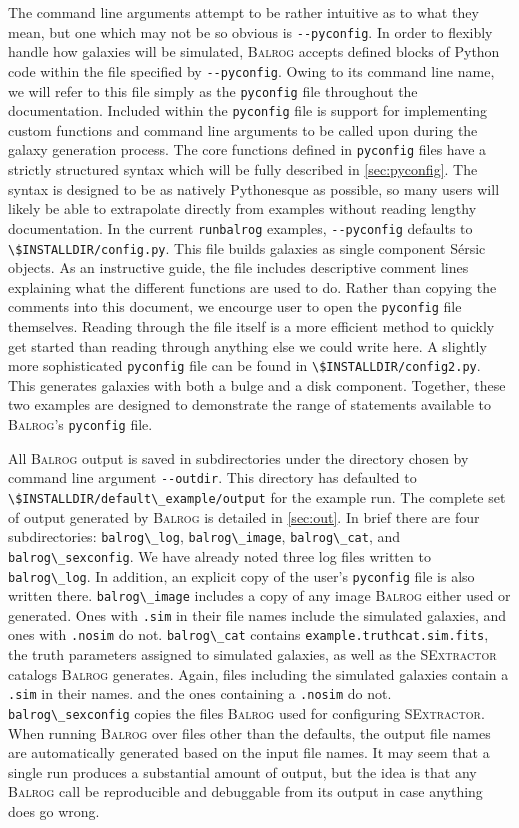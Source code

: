 \documentclass[12pt]{book}
\newcommand{\codett}[1]{\lstinline{#1}}
\newcommand{\py}{Python}
\newcommand{\pyconfig}{\codett{pyconfig}}
\newcommand{\balrog}{\textsc{Balrog}}
\newcommand{\sex}{\textsc{SExtractor}}
\newcommand{\opt}[1]{\codett{--#1}}
\newcommand{\sersic}{S\'{e}rsic}
\begin{document}
The command line arguments attempt to be rather intuitive as to what they mean,
but one which may not be so obvious is \opt{pyconfig}.
In order to flexibly handle how galaxies will be simulated, \balrog{} accepts defined blocks of \py{} code
within the file specified by \opt{pyconfig}.
Owing to its command line name, we will refer to this file simply as the \pyconfig{} file
throughout the documentation.
Included within the \pyconfig{} file is support for implementing custom functions 
and command line arguments to be called upon during the galaxy generation process.
The core functions defined in \pyconfig{} files have a strictly
structured syntax which will be fully described in \autoref{sec:pyconfig}. 
The syntax is designed to be as natively \py esque as possible, so
many users will likely be able to extrapolate directly from examples without reading lengthy documentation. 
In the current \codett{runbalrog} examples, \opt{pyconfig} defaults to \codett{\$INSTALLDIR/config.py}.
This file builds galaxies as single component \sersic{} objects.
As an instructive guide, the file includes descriptive comment lines explaining what the different functions are used to do.
Rather than copying the comments into this document, we encourge user to open the \pyconfig{} file themselves.
Reading through the file itself is a more efficient method to quickly get started than
reading through anything else we could write here.
A slightly more sophisticated \pyconfig{} file can be found in \codett{\$INSTALLDIR/config2.py}.
This generates galaxies with both a bulge and a disk component.
Together, these two examples are designed to demonstrate the range of statements available to 
\balrog{}'s \pyconfig{} file.

All \balrog{} output is saved in subdirectories under the directory chosen by command line argument \opt{outdir}.
This directory has defaulted to \codett{\$INSTALLDIR/default\_example/output} for the example run.
The complete set of output generated by \balrog{} is detailed in \autoref{sec:out}.
In brief there are four subdirectories:
\codett{balrog\_log}, \codett{balrog\_image}, \codett{balrog\_cat}, and \codett{balrog\_sexconfig}.
We have already noted three log files written to \codett{balrog\_log}. In addition, an explicit copy of 
the user's \pyconfig{} file is also written there.
\codett{balrog\_image} includes a copy of any image \balrog{} either used or generated.
Ones with \codett{.sim} in their file names include the simulated galaxies, and ones with \codett{.nosim} do not.
\codett{balrog\_cat} contains \codett{example.truthcat.sim.fits}, the truth parameters assigned to simulated galaxies,
as well as the \sex{} catalogs \balrog{} generates.
Again, files including the simulated galaxies contain a \codett{.sim} in their names.
and the ones containing a \codett{.nosim} do not.
\codett{balrog\_sexconfig} copies the files \balrog{} used for configuring \sex{}.
When running \balrog{} over files other than the defaults, 
the output file names are automatically generated based on the input file names.
It may seem that a single run produces a substantial amount of output, but the idea
is that any \balrog{} call be reproducible and debuggable from its output in case anything does go wrong.
\end{document}
